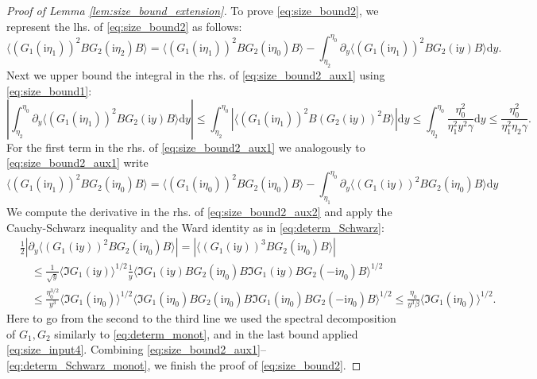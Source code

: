 \documentclass[10pt]{amsart}
\numberwithin{equation}{section}
\newcommand{\dif}{\mathrm{d}}
\newcommand{\ii}{\mathrm{i}}
\begin{document}
\begin{proof}[Proof of Lemma \ref{lem:size_bound_extension}]
To prove \eqref{eq:size_bound2}, we represent the lhs. of \eqref{eq:size_bound2} as follows:
\begin{equation}
\langle (G_1(\ii\eta_1))^2 B G_2(\ii\eta_2)B\rangle = \langle (G_1(\ii\eta_1))^2 B G_2(\ii\eta_0)B\rangle - \int_{\eta_2}^{\eta_0}\partial_y \langle (G_1(\ii\eta_1))^2 B G_2(\ii y)B\rangle\dif y.
\label{eq:size_bound2_aux1}
\end{equation}
Next we upper bound the integral in the rhs. of \eqref{eq:size_bound2_aux1} using \eqref{eq:size_bound1}:
\begin{equation}
\left\vert\int_{\eta_2}^{\eta_0}\!\!\partial_y \langle (G_1(\ii\eta_1))^2 B G_2(\ii y)B\rangle\dif y\right\vert \le \int_{\eta_2}^{\eta_0}\!\! \left\vert \langle (G_1(\ii\eta_1))^2 B (G_2(\ii y))^2 B\rangle\right\vert\dif y\le \int_{\eta_2}^{\eta_0}\!\! \frac{\eta_0^2}{\eta_1^2y^2\gamma}\dif y\le \frac{\eta_0^2}{\eta_1^2\eta_2\gamma}.
\end{equation}
For the first term in the rhs. of \eqref{eq:size_bound2_aux1} we analogously to \eqref{eq:size_bound2_aux1} write
\begin{equation}
\langle (G_1(\ii\eta_1))^2 B G_2(\ii\eta_0)B\rangle = \langle (G_1(\ii\eta_0))^2 B G_2(\ii\eta_0)B\rangle-\int_{\eta_1}^{\eta_0}\partial_y \langle (G_1(\ii y))^2 B G_2(\ii\eta_0)B\rangle\dif y
\label{eq:size_bound2_aux2}
\end{equation}
We compute the derivative in the rhs. of \eqref{eq:size_bound2_aux2} and apply the Cauchy-Schwarz inequality and the Ward identity as in \eqref{eq:determ_Schwarz}:
\begin{equation}
\begin{split}
&\frac{1}{2}\left\vert \partial_y \langle (G_1(\ii y))^2 B G_2(\ii\eta_0)B\rangle\right\vert =\left\vert \langle (G_1(\ii y))^3 B G_2(\ii\eta_0)B\rangle\right\vert \\
&\quad\le  \frac{1}{\sqrt{y}}\langle\Im G_1(\ii y)\rangle^{1/2}\frac{1}{y}\langle \Im G_1(\ii y)BG_2(\ii \eta_0)B\Im G_1(\ii y)B G_2(-\ii\eta_0)B\rangle^{1/2}\\
&\quad \le \frac{\eta_0^{3/2}}{y^3} \langle \Im G_1(\ii\eta_0)\rangle^{1/2}\langle \Im G_1(\ii \eta_0)BG_2(\ii \eta_0)B\Im G_1(\ii \eta_0)B G_2(-\ii\eta_0)B\rangle^{1/2}\le \frac{\eta_0}{y^3\beta} \langle \Im G_1(\ii\eta_0)\rangle^{1/2}.
\end{split}
\label{eq:determ_Schwarz_monot}
\end{equation}
Here to go from the second to the third line we used the spectral decomposition of $G_1, G_2$ similarly to \eqref{eq:determ_monot}, and in the last bound applied \eqref{eq:size_input4}. Combining \eqref{eq:size_bound2_aux1}--\eqref{eq:determ_Schwarz_monot}, we finish the proof of \eqref{eq:size_bound2}.
\end{proof}
\end{document}

